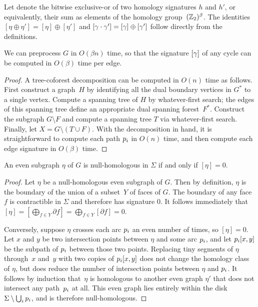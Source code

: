 Let  denote the bitwise exclusive-or of two homology signatures $h$ and $h'$, or equivalently, their sum as elements of the homology group~$(\mathbb{Z}_2)^\beta$.  The identities $[\eta \oplus \eta'] = [\eta] \oplus [\eta']$ and $[\gamma\cdot\gamma'] = [\gamma] \oplus [\gamma']$ follow directly from the definitions.

\begin{lemma}
\label{lem:sign}
We can preprocess $G$ in $O(\beta n)$ time, so that the signature $[\gamma]$ of any cycle can be computed in $O(\beta)$ time per edge.
\end{lemma}

\begin{proof}
A tree-coforest decomposition can be computed in $O(n)$ time as follows.  First construct a graph~$H$ by identifying all the dual boundary vertices in $G^*$ to a single vertex.  Compute a spanning tree of $H$ by whatever-first search; the edges of this spanning tree define an appropriate dual spanning forest~$F^*$.  Construct the subgraph $G\setminus F$ and compute a spanning tree $T$ via whatever-first search.  Finally, let $X = G\setminus (T\cup F)$.  With the decomposition in hand, it is straightforward to compute each path $p_i$ in $O(n)$ time, and then compute each edge signature in $O(\beta)$ time.
\end{proof}

\begin{lemma}
An even subgraph $\eta$ of $G$ is null-homologous in $\Sigma$ if and only if $[\eta] = 0$.
\end{lemma}

\begin{proof}
Let $\eta$ be a null-homologous even subgraph of $G$.  Then by definition, $\eta$ is the boundary of the union of a subset~$Y$ of faces of $G$.  The boundary of any face $f$ is contractible in $\Sigma$ and therefore has signature $0$.  It follows immediately that $[\eta] = [\bigoplus_{f\in Y} \partial f] = \bigoplus_{f\in Y} [\partial f] = 0$.

Conversely, suppose $\eta$ crosses each arc $p_i$ an even number of times, so $[\eta]=0$.  Let $x$ and $y$ be two intersection points between $\eta$ and some arc $p_i$, and let $p_i[x,y]$ be the subpath of $p_i$ between those two points.  Replacing tiny segments of $\eta$ through~$x$ and~$y$ with two copies of $p_i[x,y]$ does not change the homology class of $\eta$, but does reduce the number of intersection points between $\eta$ and $p_i$.  It follows by induction that~$\eta$ is homologous to another even graph $\eta'$ that does not intersect any path~$p_i$ at all.  This even graph lies entirely within the disk $\Sigma\setminus \bigcup_ip_i$, and is therefore null-homologous.
\end{proof}


